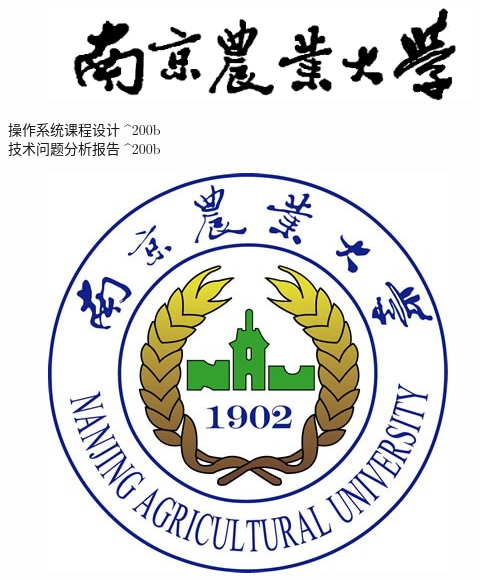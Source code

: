 \begin{figure}[!htbp]
	\centering
	\includegraphics[scale=0.11]{pic/top}
\end{figure}

\vspace{22.5pt}

\begin{center}
	{ {\fzyt 操作系统课程设计}}^^^^200b \\%
	{ {\fzyt 技术问题分析报告}}^^^^200b \\%

\end{center}

\vspace{42.8pt}

\begin{figure}[!htbp]
	\centering
	\includegraphics[scale=0.4244]{pic/logo}
\end{figure}

